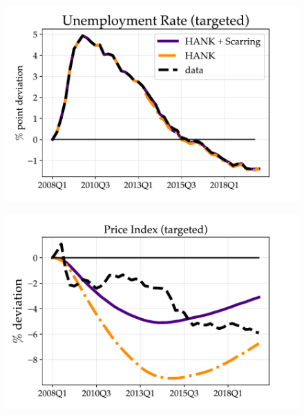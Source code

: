 \begin{figure}[] %
\centering
\begin{minipage}{0.51\textwidth}
\includegraphics[scale=.55]{text/chapter1/Figures/GR_sim/Urate}
 \label{fig:a}
\end{minipage}\hspace*{\fill}
\begin{minipage}{0.51\textwidth}
\includegraphics[scale=.55]{text/chapter1/Figures/GR_sim/PCE_defl}
 \label{fig:b}
\end{minipage}


\end{figure}
